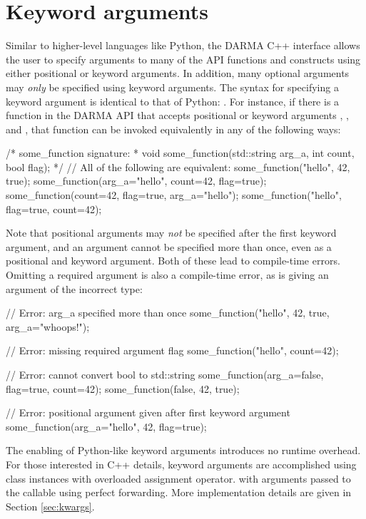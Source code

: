 \section{Keyword arguments}
\label{sec:keyword}
Similar to higher-level languages like Python, the DARMA C++ interface allows the user
to specify arguments to many of the API functions and constructs using either positional
or keyword arguments. In addition, many optional arguments may {\em only} be specified using
keyword arguments. The syntax for specifying a keyword argument is identical to that
of Python: .  For instance, if there is 
a function  in the DARMA API that accepts 
positional or keyword arguments , 
, and , that function can be invoked 
equivalently in any of the following ways:
\begin{CppCode}
/* some_function signature:
 *  void some_function(std::string arg_a, int count, bool flag);
 */
// All of the following are equivalent:
some_function("hello", 42, true);
some_function(arg_a="hello", count=42, flag=true);
some_function(count=42, flag=true, arg_a="hello");
some_function("hello", flag=true, count=42);
\end{CppCode}
Note that positional arguments may {\em not} be specified after the first keyword argument,
and an argument cannot be specified more than once, even as a positional and keyword
argument.  Both of these lead to compile-time errors. Omitting a required argument is 
also a compile-time error, as is giving an argument of the incorrect type: 
\begin{CppCode}
// Error: arg_a specified more than once
some_function("hello", 42, true, arg_a="whoops!");

// Error: missing required argument flag
some_function("hello", count=42);

// Error: cannot convert bool to std::string
some_function(arg_a=false, flag=true, count=42);
some_function(false, 42, true);

// Error: positional argument given after first keyword argument
some_function(arg_a="hello", 42, flag=true);
\end{CppCode}
The enabling of Python-like keyword arguments introduces no runtime overhead.
For those interested in C++ details, keyword arguments are accomplished using  class instances with overloaded assignment operator.  
with arguments passed to the callable using perfect forwarding.
More implementation details are given in Section \ref{sec:kwargs}.  

